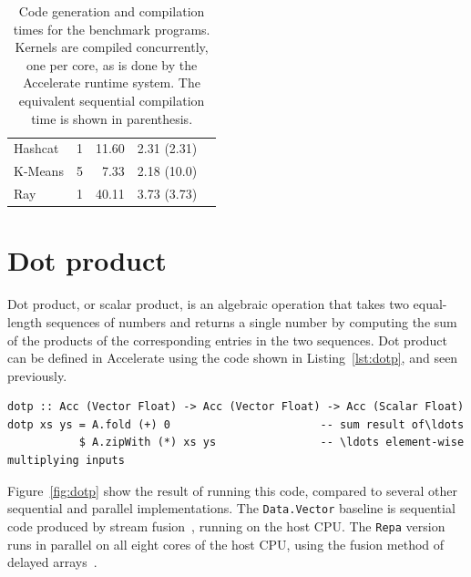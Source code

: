 \begin{table}
\begin{tabu}{lrrrr}
Hashcat
    & 1
    & 11.60     %
    & 2.31 (2.31)
    \\

K-Means
    & 5
    & 7.33      %
    & 2.18 (10.0)
    \\

Ray
    & 1
    & 40.11     %
    & 3.73 (3.73)
    \\

\bottomrule

    \end{tabu}
    \caption{Code generation and compilation times for the benchmark programs.
        Kernels are compiled concurrently, one per core, as is done by the
        Accelerate runtime system. The equivalent sequential compilation time is
        shown in parenthesis.}
    \label{tab:compilation_times}
\end{table}



\section{Dot product}
\label{sec:dotp}

Dot product, or scalar product, is an algebraic operation that takes two
equal-length sequences of numbers and returns a single number by computing the
sum of the products of the corresponding entries in the two sequences. Dot
product can be defined in Accelerate using the code shown in
Listing~\ref{lst:dotp}, and seen previously.

\begin{lstlisting}[style=haskell_float
    ,label=lst:dotp
    ,caption={Vector dot-product}]
dotp :: Acc (Vector Float) -> Acc (Vector Float) -> Acc (Scalar Float)
dotp xs ys = A.fold (+) 0                       -- sum result of\ldots
           $ A.zipWith (*) xs ys                -- \ldots element-wise multiplying inputs
\end{lstlisting}

Figure~\ref{fig:dotp} show the result of running this code, compared to several
other sequential and parallel implementations. The \texttt{Data.Vector} baseline
is sequential code produced by stream
fusion~\cite{Coutts:2007kp}, running on the host CPU. The \texttt{Repa} version
runs in parallel on all eight cores of the host CPU, using the fusion method of
delayed arrays~\cite{Keller:2010er}.

